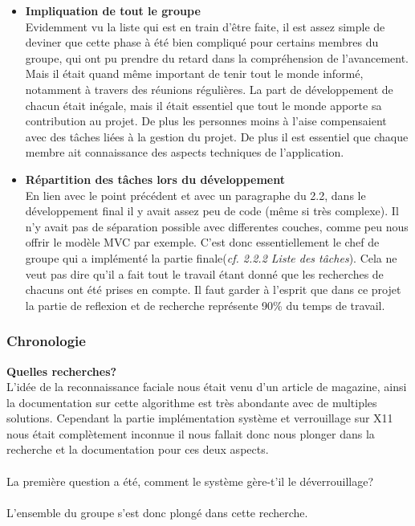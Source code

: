 \documentclass[french]{report}
\begin{document}
\begin{itemize}[label=\textbullet, font=\normalfont \color{blue}]
  \item{\textbf{Impliquation de tout le groupe}}\\
Evidemment vu la liste qui est en train d'être faite, il est assez simple de deviner
que cette phase à été bien compliqué pour certains membres du groupe, qui ont pu
prendre du retard dans la compréhension de l'avancement. Mais il était quand même
important de tenir tout le monde informé, notamment à travers des réunions régulières.
La part de développement de chacun était inégale, mais il était essentiel que
tout le monde apporte sa contribution au projet. De plus les personnes moins à l'aise
compensaient avec des tâches liées à la gestion du projet. De plus il est essentiel que chaque membre ait
connaissance des aspects techniques de l'application.\\

  \item{\textbf{Répartition des tâches lors du développement}}\\
En lien avec le point précédent et avec un paragraphe du 2.2, dans le développement
final il y avait assez peu de code (même si très complexe). Il n'y avait pas de
séparation possible avec differentes couches, comme peu nous offrir le modèle MVC
par exemple. C'est donc essentiellement le chef de groupe qui a implémenté la partie
finale(\emph{cf. 2.2.2 Liste des tâches}). Cela ne veut pas dire qu'il a fait tout
le travail étant donné que les recherches de chacuns ont été prises en compte. Il
faut garder à l'esprit que dans ce projet la partie de reflexion et de recherche
représente 90\% du temps de travail.\\

\end{itemize}

\subsubsection{Chronologie}

\vspace{0.5cm}
\textbf{Quelles recherches?}\\

  L’idée de la reconnaissance faciale nous était venu d’un article de magazine,
  ainsi la documentation sur cette algorithme est très abondante avec de
  multiples solutions. Cependant la partie implémentation système et
  verrouillage sur X11 nous était complètement inconnue il nous fallait donc
  nous plonger dans la recherche et la documentation pour ces deux aspects.
\\ \\
  La première question a été, comment le système gère-t’il le déverrouillage?
\\ \\
  L’ensemble du groupe s’est donc plongé dans cette recherche.
\end{document}
